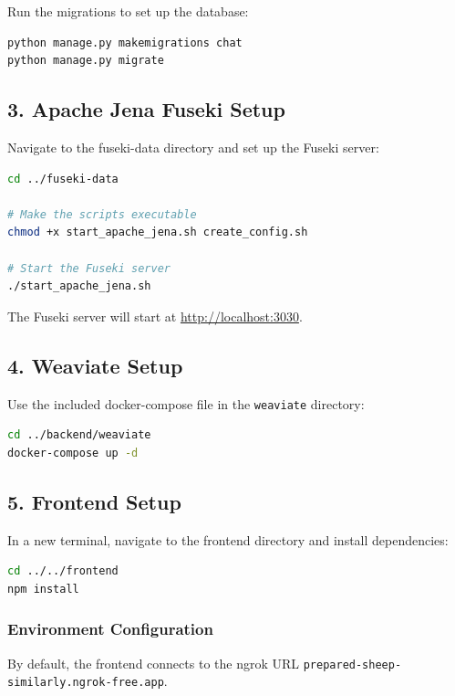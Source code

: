 Run the migrations to set up the database:

\begin{lstlisting}[language=bash]
python manage.py makemigrations chat
python manage.py migrate
\end{lstlisting}

\subsection*{3. Apache Jena Fuseki Setup}

Navigate to the fuseki-data directory and set up the Fuseki server:

\begin{lstlisting}[language=bash]
cd ../fuseki-data

# Make the scripts executable
chmod +x start_apache_jena.sh create_config.sh

# Start the Fuseki server
./start_apache_jena.sh
\end{lstlisting}

The Fuseki server will start at \url{http://localhost:3030}.

\subsection*{4. Weaviate Setup}

Use the included docker-compose file in the \texttt{weaviate} directory:

\begin{lstlisting}[language=bash]
cd ../backend/weaviate
docker-compose up -d
\end{lstlisting}

\subsection*{5. Frontend Setup}

In a new terminal, navigate to the frontend directory and install dependencies:

\begin{lstlisting}[language=bash]
cd ../../frontend
npm install
\end{lstlisting}

\subsubsection*{Environment Configuration}

By default, the frontend connects to the ngrok URL \texttt{prepared-sheep-similarly.ngrok-free.app}.

